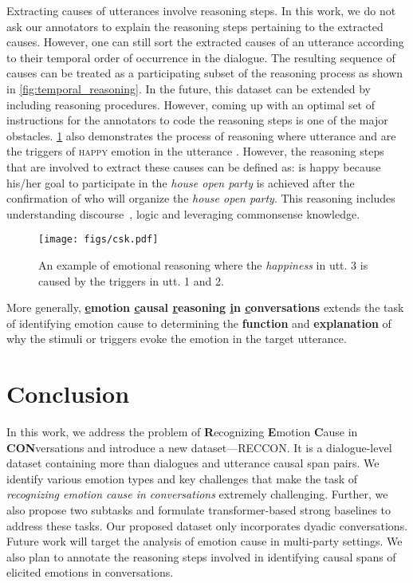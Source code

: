 \documentclass[11pt,a4paper]{article}
\theoremstyle{definition}
\newcommand\emo[1]{\textsc{#1}}
\newcommand\RECCON{\emph{recognizing emotion cause in conversations}}
\newcommand\RECCONDA{RECCON}
\begin{document}
Extracting causes of utterances involve reasoning steps. In this work, we do not ask our annotators to explain the reasoning steps pertaining to the extracted causes. However, one can still sort the extracted causes of an utterance according to their temporal order of occurrence in the dialogue. The resulting sequence of causes can be treated as a participating subset of the reasoning process as shown in \cref{fig:temporal_reasoning}. In the future, this dataset can be extended by including reasoning procedures. However, coming up with an optimal set of instructions for the annotators to code the reasoning steps is one of the major obstacles. \cref{fig:csk_ex} also demonstrates the process of reasoning where utterance  and  are the triggers of \emo{happy} emotion in the utterance . However, the reasoning steps that are involved to extract these causes can be defined as:  is happy because his/her goal to participate in the \textit{house open party} is achieved after the confirmation of  who will organize the \textit{house open party}. This reasoning includes understanding discourse~\cite{chakrabarty-etal-2019-ampersand}, logic and leveraging commonsense knowledge.
\begin{figure}[ht!]
    \centering
    \texttt{[image: figs/csk.pdf]}
    \caption{\footnotesize{An example of emotional reasoning where the \emph{happiness} in utt. 3 is caused by the triggers in utt. 1 and 2.}}
    \label{fig:csk_ex}
\end{figure}

More generally, \textbf{\underline{e}motion \underline{c}ausal \underline{r}easoning \underline{i}n \underline{c}on\-ver\-sa\-tions} extends the task of identifying emotion cause to determining the \textbf{function} and \textbf{explanation} of why the stimuli or triggers evoke the emotion in the target utterance. 


















\section{Conclusion}
In this work, we address the problem of \textbf{R}ecognizing \textbf{E}motion \textbf{C}ause in \textbf{CON}versations and introduce a new dataset---\RECCONDA{}. It is a dialogue-level dataset containing more than  dialogues and  utterance causal span pairs. We identify various emotion types and key challenges that make the task of \RECCON{} extremely challenging. Further, we also propose two subtasks and formulate transformer-based strong baselines to address these tasks. Our proposed dataset only incorporates dyadic conversations. Future work will target the analysis of emotion cause in multi-party settings. We also plan to annotate the reasoning steps involved in identifying causal spans of elicited emotions in conversations.
\end{document}

